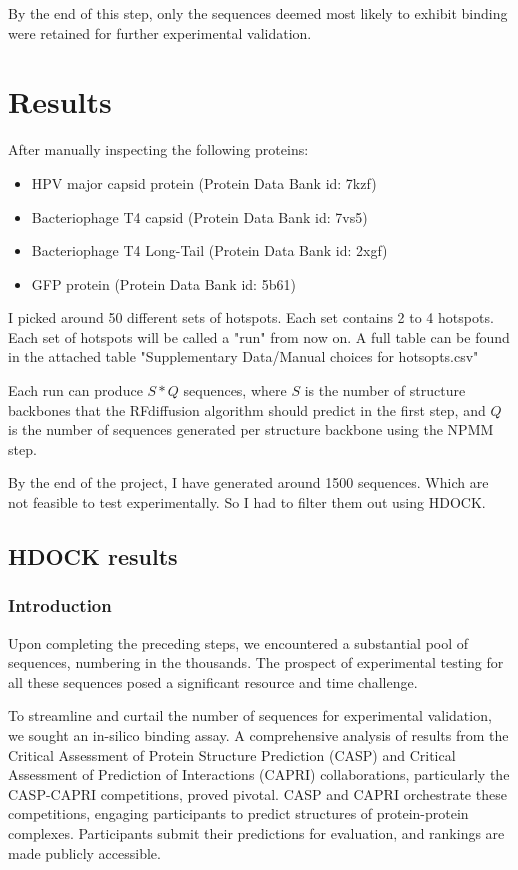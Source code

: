 \documentclass[11pt,a4paper]{article}
\begin{document}
By the end of this step, only the sequences deemed most likely to exhibit binding were retained for further experimental validation.


\section{Results}

After manually inspecting the following proteins:

\begin{itemize}
    \item HPV major capsid protein (Protein Data Bank id: 7kzf)
    \item Bacteriophage T4 capsid (Protein Data Bank id: 7vs5)
    \item Bacteriophage T4 Long-Tail (Protein Data Bank id: 2xgf)
    \item GFP protein (Protein Data Bank id: 5b61)
\end{itemize}

I picked around 50 different sets of hotspots. Each set contains 2 to 4 hotspots. Each set of hotspots will be called a "run" from now on. A full table can be found in the attached table "Supplementary Data/Manual choices for hotsopts.csv" 

Each run can produce $S*Q$ sequences, where $S$ is the number of structure backbones that the RFdiffusion algorithm should predict in the first step, and $Q$ is the number of sequences generated per structure backbone using the NPMM step.

By the end of the project, I have generated around 1500 sequences. Which are not feasible to test experimentally. So I had to filter them out using HDOCK.

\subsection{HDOCK results}

\subsubsection{Introduction}

Upon completing the preceding steps, we encountered a substantial pool of sequences, numbering in the thousands. The prospect of experimental testing for all these sequences posed a significant resource and time challenge.

To streamline and curtail the number of sequences for experimental validation, we sought an in-silico binding assay. A comprehensive analysis of results from the Critical Assessment of Protein Structure Prediction (CASP) and Critical Assessment of Prediction of Interactions (CAPRI) collaborations, particularly the CASP-CAPRI competitions, proved pivotal. CASP and CAPRI orchestrate these competitions, engaging participants to predict structures of protein-protein complexes. Participants submit their predictions for evaluation, and rankings are made publicly accessible.
\end{document}
